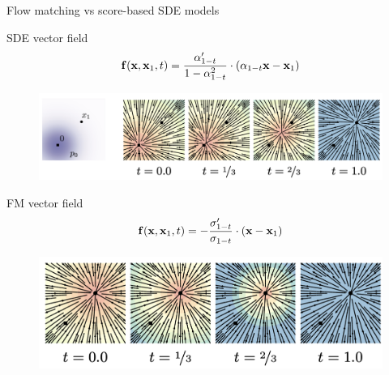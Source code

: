 \begin{frame}{Flow matching vs score-based SDE models}
	\begin{block}{SDE vector field}
		\vspace{-0.3cm}
		\[
			\mathbf{f}(\mathbf{x}, \mathbf{x}_1, t) = \frac{\alpha'_{1-t}}{1 - \alpha^2_{1-t}}\cdot \left(\alpha_{1-t}  \mathbf{x} - \mathbf{x}_1\right)
		\]
		\vspace{-0.5cm}
		\begin{figure}
			\raggedleft
			\includegraphics[width=0.8\linewidth]{figs/diff_cond_path}
		\end{figure}
		\vspace{-0.5cm}
	\end{block}
	\begin{block}{FM vector field}
		\vspace{-0.5cm}
		\[
			\mathbf{f}(\mathbf{x}, \mathbf{x}_1, t) = - \frac{\sigma'_{1-t}}{\sigma_{1-t}} \cdot (\mathbf{x} - \mathbf{x}_1)
		\]
		\vspace{-0.5cm}
		\begin{figure}
			\raggedleft
			\includegraphics[width=0.6\linewidth]{figs/ot_cond_path}
		\end{figure}
	\end{block}
\end{frame}
